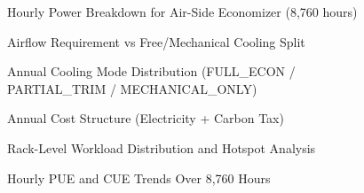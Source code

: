 \documentclass[12pt,a4paper]{report}
\begin{document}
\begin{figure}[H]
\centering
{}
\caption{Hourly Power Breakdown for Air-Side Economizer (8{,}760 hours)}
\label{fig:air_power}
\end{figure}

\begin{figure}[H]
\centering
{}
\caption{Airflow Requirement vs Free/Mechanical Cooling Split}
\label{fig:air_airflow}
\end{figure}

\begin{figure}[H]
\centering
{}
\caption{Annual Cooling Mode Distribution (FULL\_ECON / PARTIAL\_TRIM / MECHANICAL\_ONLY)}
\label{fig:air_modes}
\end{figure}

\begin{figure}[H]
\centering
{}
\caption{Annual Cost Structure (Electricity + Carbon Tax)}
\label{fig:air_cost}
\end{figure}

\begin{figure}[H]
\centering
{}
\caption{Rack-Level Workload Distribution and Hotspot Analysis}
\label{fig:air_racks}
\end{figure}

\begin{figure}[H]
\centering
{}
\caption{Hourly PUE and CUE Trends Over 8{,}760 Hours}
\label{fig:air_pue_cue}
\end{figure}
\end{document}
